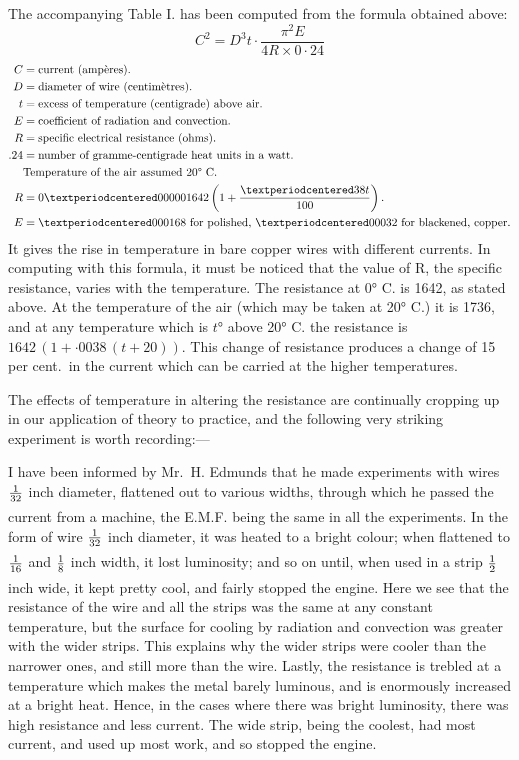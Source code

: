 \documentclass[12pt,oneside]{book}[2021/10/04]
\newcommand{\xp}{\rule[-2.2ex]{0pt}{3.4ex}}
\newcommand{\xpa}{\rule[-1.6ex]{0pt}{3.4ex}}
\begin{document}
The accompanying Table I. has been computed from the formula
obtained above:
\[
C^2 = D^3 t\cdot\frac{\pi^2 E}{4 R \times 0·24}
\]
\begin{align*}
C &= \text{current (ampères).}\\
D &= \text{diameter of wire (centimètres).}\\
t &= \text{excess of temperature (centigrade) above air.}\\
E &= \text{coefficient of radiation and convection.}\\
R &= \text{specific electrical resistance (ohms).}\\
.24 &= \text{number of gramme-centigrade heat units in a watt.}\\
&\text{Temperature of the air assumed 20° C.}\\
R &= 0·000001642 \xp\left(1 + \dfrac{·38 t}{100}\right)\text{.}\\
E &= \text{·000168 for polished, ·00032 for blackened, copper.}\\
\end{align*}
It gives the rise in temperature in bare copper
wires with different currents. In computing with this formula, it
must be noticed that the value of R, the specific resistance, varies
with the temperature. The resistance at 0° C. is 1642, as stated
above. At the temperature of the air (which may be taken at
20° C.) it is 1736, and at any temperature which is \(t\)° above 20° C.
the resistance is \(1642\,(1 + ·0038\,(t + 20))\). This change of resistance
produces a change of 15 per cent.\ in the current which can
be carried at the higher temperatures.

The effects of temperature in altering the resistance are continually
cropping up in our application of theory to practice, and
the following very striking experiment is worth recording:—

I have been informed by Mr.\ H. Edmunds that he made experiments
with wires \(\xpa\frac{1}{32}\) inch diameter, flattened out to various widths,
through which he passed the current from a machine, the E.M.F.
being the same in all the experiments. In the form of wire \(\xpa\frac{1}{32}\)
inch diameter, it was heated to a bright colour; when flattened to
\(\xpa\frac{1}{16}\) and \(\xpa\frac{1}{8}\) inch width, it lost luminosity; and so on until, when used
in a strip \(\xpa\frac{1}{2}\) inch wide, it kept pretty cool, and fairly stopped the
engine. Here we see that the resistance of the wire and all the
strips was the same at any constant temperature, but the surface
for cooling by radiation and convection was greater with the wider
strips. This explains why the wider strips were cooler than the
narrower ones, and still more than the wire. Lastly, the resistance
is trebled at a temperature which makes the metal barely luminous,
and is enormously increased at a bright heat. Hence, in the cases
where there was bright luminosity, there was high resistance and
less current. The wide strip, being the coolest, had most current,
and used up most work, and so stopped the engine.
\end{document}
